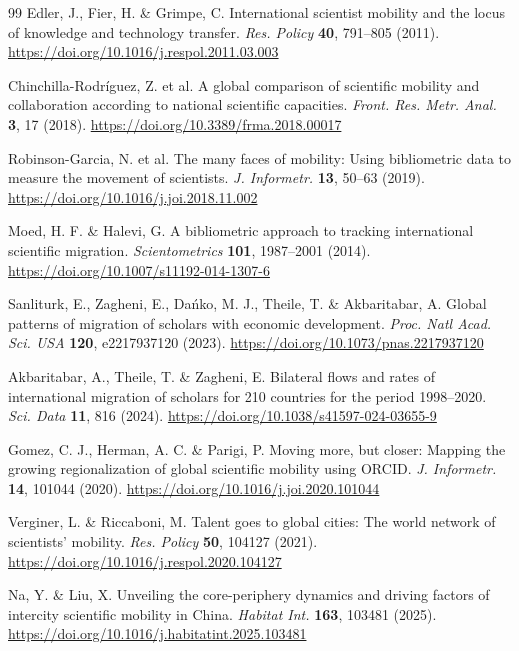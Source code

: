 \begin{thebibliography}{99}
Edler, J., Fier, H. \& Grimpe, C. International scientist mobility and the locus of knowledge and technology transfer. \textit{Res. Policy} \textbf{40}, 791--805 (2011). \url{https://doi.org/10.1016/j.respol.2011.03.003}

Chinchilla-Rodríguez, Z. et al. A global comparison of scientific mobility and collaboration according to national scientific capacities. \textit{Front. Res. Metr. Anal.} \textbf{3}, 17 (2018). \url{https://doi.org/10.3389/frma.2018.00017}

Robinson-Garcia, N. et al. The many faces of mobility: Using bibliometric data to measure the movement of scientists. \textit{J. Informetr.} \textbf{13}, 50--63 (2019). \url{https://doi.org/10.1016/j.joi.2018.11.002}

Moed, H. F. \& Halevi, G. A bibliometric approach to tracking international scientific migration. \textit{Scientometrics} \textbf{101}, 1987--2001 (2014). \url{https://doi.org/10.1007/s11192-014-1307-6}

Sanliturk, E., Zagheni, E., Dańko, M. J., Theile, T. \& Akbaritabar, A. Global patterns of migration of scholars with economic development. \textit{Proc. Natl Acad. Sci. USA} \textbf{120}, e2217937120 (2023). \url{https://doi.org/10.1073/pnas.2217937120}

Akbaritabar, A., Theile, T. \& Zagheni, E. Bilateral flows and rates of international migration of scholars for 210 countries for the period 1998--2020. \textit{Sci. Data} \textbf{11}, 816 (2024). \url{https://doi.org/10.1038/s41597-024-03655-9}

Gomez, C. J., Herman, A. C. \& Parigi, P. Moving more, but closer: Mapping the growing regionalization of global scientific mobility using ORCID. \textit{J. Informetr.} \textbf{14}, 101044 (2020). \url{https://doi.org/10.1016/j.joi.2020.101044}

Verginer, L. \& Riccaboni, M. Talent goes to global cities: The world network of scientists’ mobility. \textit{Res. Policy} \textbf{50}, 104127 (2021). \url{https://doi.org/10.1016/j.respol.2020.104127}

Na, Y. \& Liu, X. Unveiling the core-periphery dynamics and driving factors of intercity scientific mobility in China. \textit{Habitat Int.} \textbf{163}, 103481 (2025). \url{https://doi.org/10.1016/j.habitatint.2025.103481}


\end{thebibliography}
